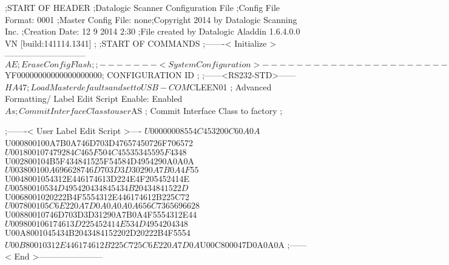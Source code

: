 ;START OF HEADER
;Datalogic Scanner Configuration File
;Config File Format: 0001
;Master Config File: none;Copyright 2014 by Datalogic Scanning Inc.
;Creation Date: 12 9 2014 2:30
;File created by Datalogic Aladdin 1.6.4.0.0 VN [build:141114.1341]
;
;START OF COMMANDS
;-------< Initialize >-----------------------------
$AE                 ; Erase Config Flash
;
;-------< System Configuration >-------------------------------
$YF00000000000000000000; CONFIGURATION ID
;
;------<RS232-STD>------
$HA47               ; Load Master defaults and set to USB-COM
$CLEEN01            ; Advanced Formatting/ Label Edit Script Enable: Enabled
$As                 ; Commit Interface Class to user
$AS                 ; Commit Interface Class to factory
;

;-------< User Label Edit Script >----
$U00000008554C453200C60A0A
$U000800100A7B0A746D703D47657450726F706572
$U001800107479284C465F504C45535345595F4348
$U002800104B5F434841525F54584D4954290A0A0A
$U003800100A696628746D703D3D30290A7B0A4F55
$U0048001054312E446174613D224E4F205452414E
$U00580010534D495420434845434B20434841522D
$U0068001020222B4F5554312E446174612B225C72
$U007800105C6E220A7D0A0A0A0A656C7365696628
$U00880010746D703D3D31290A7B0A4F5554312E44
$U009800106174613D225452414E534D4954204348
$U00A8001045434B2043484152202D20222B4F5554
$U00B80010312E446174612B225C725C6E220A7D0A
$U00C800047D0A0A0A
;------< End >-----------------------
